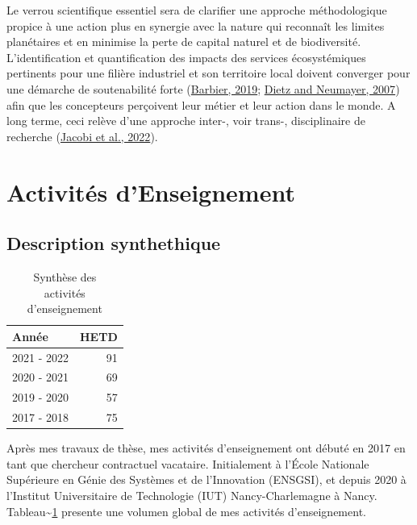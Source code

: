 \documentclass[
  11pt,
]{article}
\begin{document}
Le verrou scientifique essentiel sera de clarifier une approche
méthodologique propice à une action plus en synergie avec la nature qui
reconnaît les limites planétaires et en minimise la perte de capital
naturel et de biodiversité. L'identification et quantification des
impacts des services écosystémiques pertinents pour une filière
industriel et son territoire local doivent converger pour une démarche
de soutenabilité forte (\protect\hyperlink{ref-Barbier2019}{Barbier,
2019}; \protect\hyperlink{ref-Dietz2006}{Dietz and Neumayer, 2007}) afin
que les concepteurs perçoivent leur métier et leur action dans le monde.
A long terme, ceci relève d'une approche inter-, voir trans-,
disciplinaire de recherche (\protect\hyperlink{ref-Jacobi2022}{Jacobi et
al., 2022}).

\newpage

\hypertarget{activituxe9s-denseignement}{%
\section{Activités d'Enseignement}\label{activituxe9s-denseignement}}

\hypertarget{description-synthethique}{%
\subsection{Description synthethique}\label{description-synthethique}}

\begin{table}
   \caption{\label{tbl-heures}Synthèse des\\activités d'enseignement}
   \begin{tabular}[t]{lr}
   \toprule
   Année & HETD\\
   \midrule
   2021 - 2022 & 91\\
   2020 - 2021 & 69\\
   2019 - 2020 & 57\\
   2017 - 2018 & 75\\
   \bottomrule
   \end{tabular}
\end{table}

Après mes travaux de thèse, mes activités d'enseignement ont débuté en
2017 en tant que chercheur contractuel vacataire. Initialement à l'École
Nationale Supérieure en Génie des Systèmes et de l'Innovation (ENSGSI),
et depuis 2020 à l'Institut Universitaire de Technologie (IUT)
Nancy-Charlemagne à Nancy. Tableau\textasciitilde{}\ref{tbl-heures}
presente une volumen global de mes activités d'enseignement.
\end{document}
